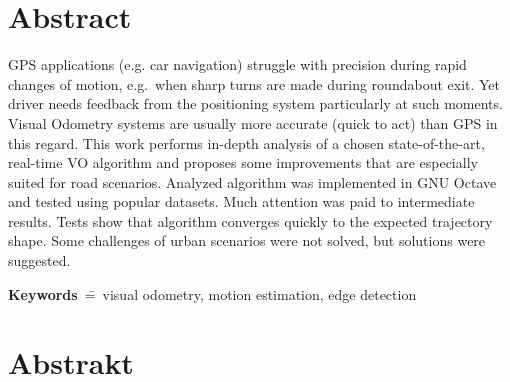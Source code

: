
\section*{Abstract}


GPS applications (e.g. car navigation) struggle with precision during rapid changes of motion, e.g.~when sharp turns are made during roundabout exit. Yet driver needs feedback from the positioning system particularly at such moments.
Visual Odometry systems are usually more accurate (quick to act) than GPS in this regard.
This work performs in-depth analysis of a chosen state-of-the-art, real-time VO algorithm and proposes some improvements that are especially suited for road scenarios.
Analyzed algorithm was implemented in GNU Octave and tested using popular datasets. Much attention was paid to intermediate results.
Tests show that algorithm converges quickly to the expected trajectory shape. Some challenges of urban scenarios were not solved, but solutions were suggested.

\textbf{Keywords}~\==~visual odometry, motion estimation, edge detection

\section*{Abstrakt}

